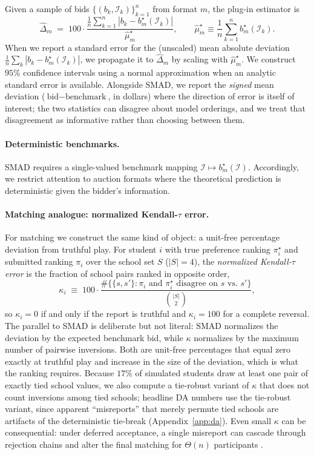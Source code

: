 Given a sample of bids $\{(b_k,\mathcal I_k)\}_{k=1}^n$ from format $m$, the
plug-in estimator is
\[
\widehat{\Delta}_m
\;=\;
100 \cdot
\frac{\frac{1}{n}\sum_{k=1}^{n}\left|b_k-b_m^\star(\mathcal I_k)\right|}
{\widehat{\mu}_m^\star},
\qquad
\widehat{\mu}_m^\star \equiv \frac{1}{n}\sum_{k=1}^{n} b_m^\star(\mathcal I_k).
\]
When we report a standard error for the (unscaled) mean absolute deviation
$\frac{1}{n}\sum_k |b_k-b_m^\star(\mathcal I_k)|$, we propagate it to
$\widehat{\Delta}_m$ by scaling with $\widehat{\mu}_m^\star$. We construct
$95\%$ confidence intervals using a normal approximation when an analytic
standard error is available. Alongside SMAD, we report the \emph{signed} mean
deviation ($\text{bid}-\text{benchmark}$, in dollars) where the direction of
error is itself of interest; the two statistics can disagree about model
orderings, and we treat that disagreement as informative rather than choosing
between them.

\paragraph{Deterministic benchmarks.}
SMAD requires a single-valued benchmark mapping
$\mathcal I \mapsto b_m^\star(\mathcal I)$. Accordingly, we restrict attention
to auction formats where the theoretical prediction is deterministic given the
bidder's information.

\paragraph{Matching analogue: normalized Kendall-$\tau$ error.}
For matching we construct the same kind of object: a unit-free percentage
deviation from truthful play. For student $i$ with true preference ranking
$\pi_i^\star$ and submitted ranking $\pi_i$ over the school set $S$
($|S|=4$), the \emph{normalized Kendall-$\tau$ error} is the fraction of
school pairs ranked in opposite order,
\[
\kappa_i \;\equiv\; 100 \cdot
\frac{\#\bigl\{\{s,s'\} : \pi_i \text{ and } \pi_i^\star \text{ disagree on } s \text{ vs.\ } s'\bigr\}}
{\binom{|S|}{2}},
\]
so $\kappa_i = 0$ if and only if the report is truthful and $\kappa_i = 100$
for a complete reversal. The parallel to SMAD is deliberate but not literal:
SMAD normalizes the deviation by the expected benchmark bid, while $\kappa$
normalizes by the maximum number of pairwise inversions. Both are unit-free
percentages that equal zero exactly at truthful play and increase in the size
of the deviation, which is what the ranking requires. Because $17\%$ of
simulated students draw at least one pair of exactly tied school values, we
also compute a tie-robust variant of $\kappa$ that does not count inversions
among tied schools; headline DA numbers use the tie-robust variant, since
apparent ``misreports'' that merely permute tied schools are artifacts of the
deterministic tie-break (Appendix~\ref{app:da}). Even small $\kappa$ can
be consequential: under deferred acceptance, a single misreport can cascade
through rejection chains and alter the final matching for $\Theta(n)$
participants \citep{dubins1981machiavelli}.

